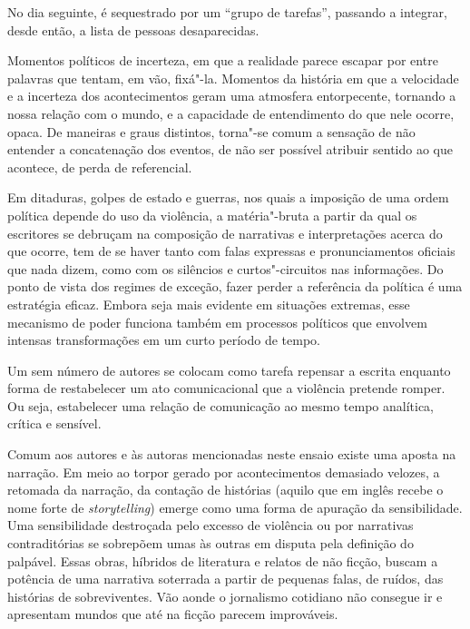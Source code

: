 No dia seguinte, é sequestrado por um ``grupo de tarefas'', passando a
integrar, desde então, a lista de pessoas desaparecidas.

\asterisc

Momentos políticos de incerteza, em que a realidade parece escapar por
entre palavras que tentam, em vão, fixá"-la. Momentos da história em que
a velocidade e a incerteza dos acontecimentos geram uma atmosfera
entorpecente, tornando a nossa relação com o mundo, e a capacidade de
entendimento do que nele ocorre, opaca. De maneiras e graus distintos,
torna"-se comum a sensação de não entender a concatenação dos eventos, de
não ser possível atribuir sentido ao que acontece, de perda de
referencial.

Em ditaduras, golpes de estado e guerras, nos quais a imposição de uma
ordem política depende do uso da violência, a matéria"-bruta a partir da
qual os escritores se debruçam na composição de narrativas e interpretações acerca do que ocorre, tem de se
haver tanto com falas expressas e pronunciamentos oficiais que nada
dizem, como com os silêncios e curtos"-circuitos nas informações. Do
ponto de vista dos regimes de exceção, fazer perder a referência da
política é uma estratégia eficaz. Embora seja mais evidente em situações
extremas, esse mecanismo de poder funciona também em processos políticos que
envolvem intensas transformações em um curto período de tempo.

Um sem número de autores se colocam como tarefa repensar a
escrita enquanto forma de restabelecer um ato comunicacional que a violência
pretende romper. Ou seja, estabelecer uma relação de comunicação ao
mesmo tempo analítica, crítica e sensível.

Comum aos autores e às autoras mencionadas neste ensaio existe uma aposta na
narração. Em meio ao torpor gerado por acontecimentos demasiado
velozes, a retomada da narração, da contação de histórias (aquilo que em
inglês recebe o nome forte de \emph{storytelling}) emerge como uma forma
de apuração da sensibilidade. Uma sensibilidade destroçada pelo excesso %
de violência ou por narrativas contraditórias se sobrepõem
umas às outras em disputa pela definição do palpável. Essas obras,
híbridos de literatura e relatos de não ficção, buscam a potência de uma
narrativa soterrada a partir de pequenas falas, de ruídos, das histórias
de sobreviventes. Vão aonde o jornalismo cotidiano não consegue ir e
apresentam mundos que até na ficção parecem improváveis.

\asterisc

